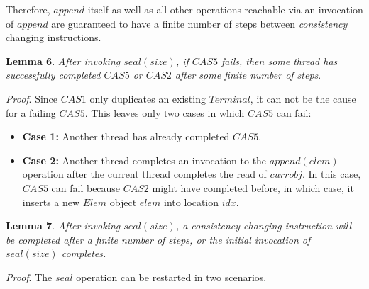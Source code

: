 \documentclass[runningheads,a4paper]{llncs}
\begin{document}
Therefore, $append$ itself as well as all other operations reachable via an
invocation of $append$ are guaranteed to have a finite number of steps between
\textit{consistency} changing instructions.


\textbf{Lemma 6}. \textit{After invoking $seal(size)$, if $CAS5$ fails, then
some thread has successfully completed $CAS5$ or $CAS2$ after some finite
number of steps}.

\textit{Proof}. Since $CAS1$ only duplicates an existing $Terminal$, it can
not be the cause for a failing $CAS5$. This leaves only two cases in which
$CAS5$ can fail:

\begin{itemize}
\item \textbf{Case 1:} Another thread has already completed $CAS5$.
\item \textbf{Case 2:} Another thread completes an invocation to the
$append(elem)$ operation after the current thread completes the read of
$currobj$. In this  case, $CAS5$ can fail because $CAS2$ might have  completed
before, in which case, it inserts a new $Elem$ object $elem$  into location
$idx$.

\end{itemize}


\textbf{Lemma 7}. \textit{After invoking $seal(size)$, a consistency changing
instruction will be completed after a finite number of steps, or the initial
invocation of $seal(size)$ completes.}

\textit{Proof}. The $seal$ operation can be restarted in two scenarios. 
\end{document}
